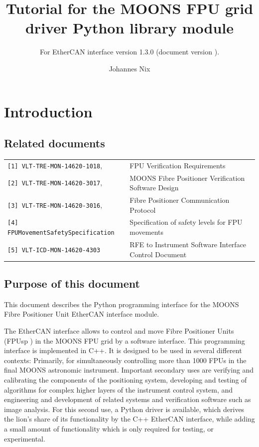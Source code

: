 \documentclass[11pt,a4paper]{scrartcl}
\begin{document}
\title{Tutorial for the MOONS FPU grid driver Python library
  module} \subtitle{For EtherCAN interface version 1.3.0 (document version \texttt{}).}

\author{Johannes Nix}

\maketitle

\tableofcontents


\section{Introduction}
\subsection{Related documents}

\begin{tabular}{|ll|}
  \hline
\verb+[1] VLT-TRE-MON-14620-1018+, &  FPU Verification Requirements \\
\verb+[2] VLT-TRE-MON-14620-3017+, & MOONS Fibre Positioner Verification Software Design \\
\verb+[3] VLT-TRE-MON-14620-3016+, & Fibre Positioner Communication Protocol\\
\verb+[4] FPUMovementSafetySpecification+ & Specification of safety levels for FPU movements\\
\verb+[5] VLT-ICD-MON-14620-4303+ & RFE to Instrument Software Interface Control Document \\
\hline
\end{tabular}


\subsection{Purpose of this document}
This document describes the Python programming interface for the MOONS
Fibre Positioner Unit EtherCAN interface module.

The EtherCAN interface allows to control and move Fibre Positioner
Units (FPUsp
) in the MOONS FPU grid by a software interface. This
programming interface is implemented in C++. It is designed to be used
in several different contexts: Primarily, for simultaneously
controlling more than 1000 FPUs in the final MOONS astronomic
instrument. Important secondary uses are verifying and calibrating the
components of the positioning system, developing and testing of
algorithms for complex higher layers of the instrument control system,
and engineering and development of related systems and verification
software such as image analysis. For this second use, a Python driver
is available, which derives the lion's share of its functionality by
the C++ EtherCAN interface, while adding a small amount of
functionality which is only required for testing, or experimental.
\end{document}
